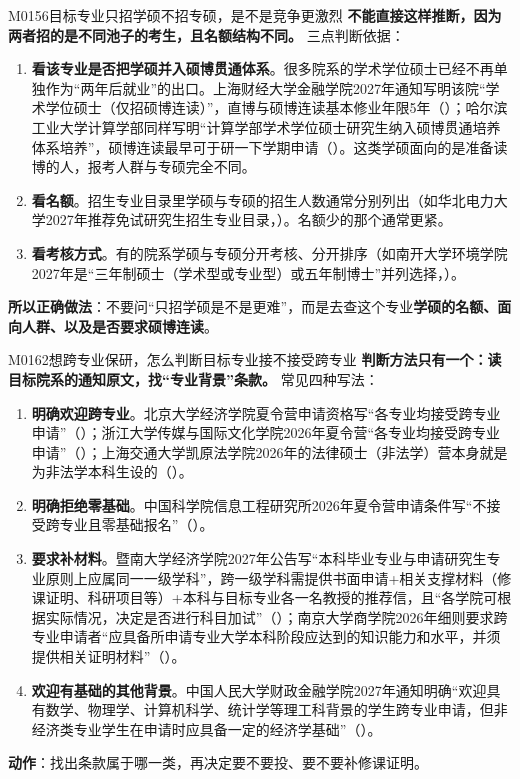 \begin{qa}{M0156}{目标专业只招学硕不招专硕，是不是竞争更激烈}
\textbf{不能直接这样推断，因为两者招的是不同池子的考生，且名额结构不同。} 三点判断依据：
\begin{enumerate}
  \item \textbf{看该专业是否把学硕并入硕博贯通体系}。很多院系的学术学位硕士已经不再单独作为“两年后就业”的出口。上海财经大学金融学院2027年通知写明该院“学术学位硕士（仅招硕博连读）”，直博与硕博连读基本修业年限5年（）；哈尔滨工业大学计算学部同样写明“计算学部学术学位硕士研究生纳入硕博贯通培养体系培养”，硕博连读最早可于研一下学期申请（）。这类学硕面向的是准备读博的人，报考人群与专硕完全不同。
  \item \textbf{看名额}。招生专业目录里学硕与专硕的招生人数通常分别列出（如华北电力大学2027年推荐免试研究生招生专业目录，）。名额少的那个通常更紧。
  \item \textbf{看考核方式}。有的院系学硕与专硕分开考核、分开排序（如南开大学环境学院2027年是“三年制硕士（学术型或专业型）或五年制博士”并列选择，）。
\end{enumerate}
\textbf{所以正确做法}：不要问“只招学硕是不是更难”，而是去查这个专业\textbf{学硕的名额、面向人群、以及是否要求硕博连读}。
\end{qa}

\begin{qa}{M0162}{想跨专业保研，怎么判断目标专业接不接受跨专业}
\textbf{判断方法只有一个：读目标院系的通知原文，找“专业背景”条款。} 常见四种写法：
\begin{enumerate}
  \item \textbf{明确欢迎跨专业}。北京大学经济学院夏令营申请资格写“各专业均接受跨专业申请”（）；浙江大学传媒与国际文化学院2026年夏令营“各专业均接受跨专业申请”（）；上海交通大学凯原法学院2026年的法律硕士（非法学）营本身就是为非法学本科生设的（）。
  \item \textbf{明确拒绝零基础}。中国科学院信息工程研究所2026年夏令营申请条件写“不接受跨专业且零基础报名”（）。
  \item \textbf{要求补材料}。暨南大学经济学院2027年公告写“本科毕业专业与申请研究生专业原则上应属同一一级学科”，跨一级学科需提供书面申请+相关支撑材料（修课证明、科研项目等）+本科与目标专业各一名教授的推荐信，且“各学院可根据实际情况，决定是否进行科目加试”（）；南京大学商学院2026年细则要求跨专业申请者“应具备所申请专业大学本科阶段应达到的知识能力和水平，并须提供相关证明材料”（）。
  \item \textbf{欢迎有基础的其他背景}。中国人民大学财政金融学院2027年通知明确“欢迎具有数学、物理学、计算机科学、统计学等理工科背景的学生跨专业申请，但非经济类专业学生在申请时应具备一定的经济学基础”（）。
\end{enumerate}
\textbf{动作}：找出条款属于哪一类，再决定要不要投、要不要补修课证明。
\end{qa}

